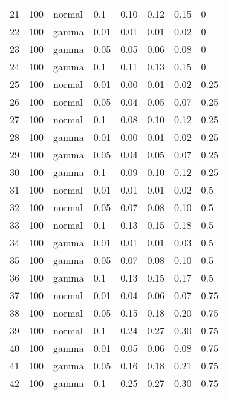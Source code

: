 \begin{table}[ht]
\begin{tabular}{rlllrrrl}
  21 & 100 & normal & 0.1 & 0.10 & 0.12 & 0.15 & 0 \\ 
  22 & 100 & gamma & 0.01 & 0.01 & 0.01 & 0.02 & 0 \\ 
  23 & 100 & gamma & 0.05 & 0.05 & 0.06 & 0.08 & 0 \\ 
  24 & 100 & gamma & 0.1 & 0.11 & 0.13 & 0.15 & 0 \\ 
  25 & 100 & normal & 0.01 & 0.00 & 0.01 & 0.02 & 0.25 \\ 
  26 & 100 & normal & 0.05 & 0.04 & 0.05 & 0.07 & 0.25 \\ 
  27 & 100 & normal & 0.1 & 0.08 & 0.10 & 0.12 & 0.25 \\ 
  28 & 100 & gamma & 0.01 & 0.00 & 0.01 & 0.02 & 0.25 \\ 
  29 & 100 & gamma & 0.05 & 0.04 & 0.05 & 0.07 & 0.25 \\ 
  30 & 100 & gamma & 0.1 & 0.09 & 0.10 & 0.12 & 0.25 \\ 
  31 & 100 & normal & 0.01 & 0.01 & 0.01 & 0.02 & 0.5 \\ 
  32 & 100 & normal & 0.05 & 0.07 & 0.08 & 0.10 & 0.5 \\ 
  33 & 100 & normal & 0.1 & 0.13 & 0.15 & 0.18 & 0.5 \\ 
  34 & 100 & gamma & 0.01 & 0.01 & 0.01 & 0.03 & 0.5 \\ 
  35 & 100 & gamma & 0.05 & 0.07 & 0.08 & 0.10 & 0.5 \\ 
  36 & 100 & gamma & 0.1 & 0.13 & 0.15 & 0.17 & 0.5 \\ 
  37 & 100 & normal & 0.01 & 0.04 & 0.06 & 0.07 & 0.75 \\ 
  38 & 100 & normal & 0.05 & 0.15 & 0.18 & 0.20 & 0.75 \\ 
  39 & 100 & normal & 0.1 & 0.24 & 0.27 & 0.30 & 0.75 \\ 
  40 & 100 & gamma & 0.01 & 0.05 & 0.06 & 0.08 & 0.75 \\ 
  41 & 100 & gamma & 0.05 & 0.16 & 0.18 & 0.21 & 0.75 \\ 
  42 & 100 & gamma & 0.1 & 0.25 & 0.27 & 0.30 & 0.75 \\ 
   \hline
\end{tabular}
\end{table}

